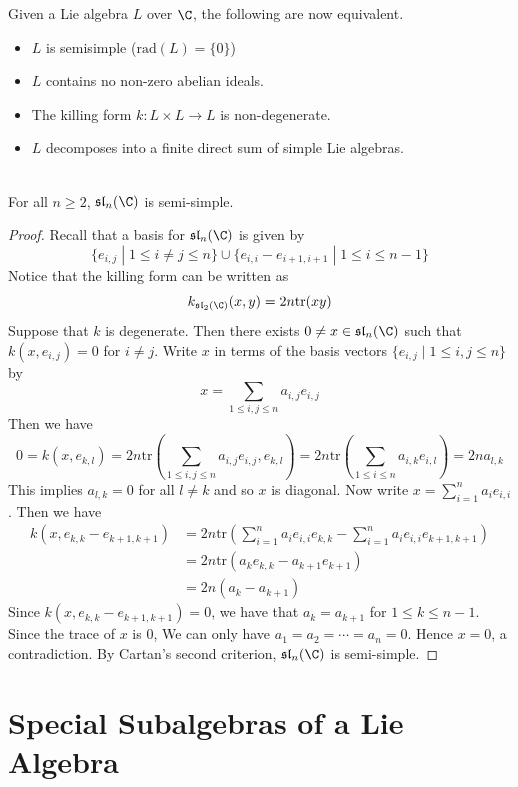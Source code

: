 \documentclass[a4paper]{article}
\begin{document}
Given a Lie algebra $L$ over $\C$, the following are now equivalent. 
\begin{itemize}
\item $L$ is semisimple ($\text{rad}(L)=\{0\}$)
\item $L$ contains no non-zero abelian ideals. 
\item The killing form $k:L\times L\to L$ is non-degenerate. 
\item $L$ decomposes into a finite direct sum of simple Lie algebras. 
\end{itemize}

\begin{eg}{}{} \\For all $n\geq 2$, $\mathfrak{sl}_n(\C)$ is semi-simple. 
\begin{proof}
Recall that a basis for $\mathfrak{sl}_n(\C)$ is given by $$\{e_{i,j}\;|\;1\leq i\neq j\leq n\}\cup\{e_{i,i}-e_{i+1,i+1}\;|\;1\leq i\leq n-1\}$$ Notice that the killing form can be written as $$k_{\mathfrak{sl}_2(\C)}(x,y)=2n\text{tr}(xy)$$ Suppose that $k$ is degenerate. Then there exists $0\neq x\in\mathfrak{sl}_n(\C)$ such that $k(x,e_{i,j})=0$ for $i\neq j$. Write $x$ in terms of the basis vectors $\{e_{i,j}\;|\;1\leq i,j\leq n\}$ by $$x=\sum_{1\leq i,j\leq n}a_{i,j}e_{i,j}$$ Then we have $$0=k(x,e_{k,l})=2n\text{tr}\left(\sum_{1\leq i,j\leq n}a_{i,j}e_{i,j},e_{k,l}\right)=2n\text{tr}\left(\sum_{1\leq i\leq n}a_{i,k}e_{i,l}\right)=2na_{l,k}$$ This implies $a_{l,k}=0$ for all $l\neq k$ and so $x$ is diagonal. Now write $x=\sum_{i=1}^na_ie_{i,i}$. Then we have 
\begin{align*}
k(x,e_{k,k}-e_{k+1,k+1})&=2n\text{tr}\left(\sum_{i=1}^na_ie_{i,i}e_{k,k}-\sum_{i=1}^na_ie_{i,i}e_{k+1,k+1}\right)\\
&=2n\text{tr}(a_ke_{k,k}-a_{k+1}e_{k+1})\\
&=2n(a_k-a_{k+1})
\end{align*}
Since $k(x,e_{k,k}-e_{k+1,k+1})=0$, we have that $a_k=a_{k+1}$ for $1\leq k\leq n-1$. Since the trace of $x$ is $0$, We can only have $a_1=a_2=\cdots=a_n=0$. Hence $x=0$, a contradiction. By Cartan's second criterion, $\mathfrak{sl}_n(\C)$ is semi-simple. 
\end{proof}
\end{eg}

\pagebreak
\section{Special Subalgebras of a Lie Algebra}
\end{document}
